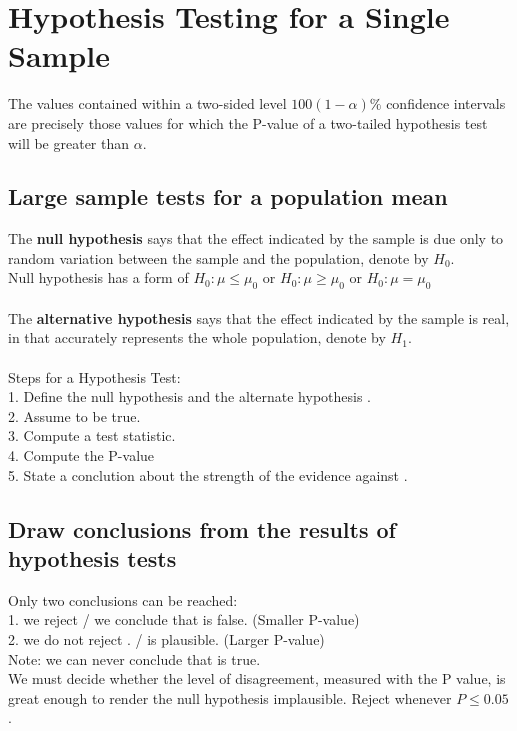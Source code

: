 \documentclass[../main.tex]{subfiles}
\begin{document}
\section{Hypothesis Testing for a Single Sample}
The values contained within a two-sided level $100(1-\alpha)\%$ confidence intervals are precisely those values for which the P-value of a two-tailed hypothesis test will be greater than $\alpha$.

\subsection{Large sample tests for a population mean}
The \textbf{null hypothesis} says that the effect indicated by the sample is due only to random variation between the sample and the population, denote by $H_0$.\\
Null hypothesis has a form of $H_0:\mu\leq\mu_0$ or $H_0:\mu\geq\mu_0$ or $H_0:\mu=\mu_0$\\
\\
The \textbf{alternative hypothesis} says that the effect indicated by the sample is real, in that accurately represents the whole population, denote by $H_1$.\\
\\
Steps for a Hypothesis Test:\\
1. Define the null hypothesis \hn and the alternate hypothesis \ha.\\
2. Assume \hn to be true.\\
3. Compute a test statistic.\\
4. Compute the P-value\\
5. State a conclution about the strength of the evidence against \hn.

\subsection{Draw conclusions from the results of hypothesis tests}
Only two conclusions can be reached:\\
1. we reject \hn / we conclude that \hn is false. (Smaller P-value)\\
2. we do not reject \hn . / \hn is plausible. (Larger P-value) \\
Note: we can never conclude that \hn is true. \\
We must decide whether the level of disagreement, measured with the P value, is great enough to render the null hypothesis implausible.
Reject \hn whenever $P\leq 0.05$.
\end{document}
